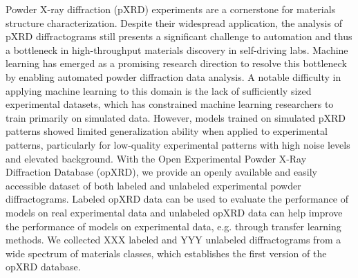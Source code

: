 Powder X-ray diffraction (pXRD) experiments are a cornerstone for materials structure characterization.
Despite their widespread application, the analysis of pXRD diffractograms still presents a significant challenge to automation and thus a bottleneck in high-throughput materials discovery in self-driving labs.
Machine learning has emerged as a promising research direction to resolve this bottleneck by enabling automated powder diffraction data analysis.
A notable difficulty in applying machine learning to this domain is the lack of sufficiently sized experimental datasets, which has constrained machine learning researchers to train primarily on simulated data. However, models trained on simulated pXRD patterns showed limited generalization ability when applied to experimental patterns, particularly for low-quality experimental patterns with high noise levels and elevated background.
With the Open Experimental Powder X-Ray Diffraction Database (opXRD), we provide an openly available and easily accessible dataset of both labeled and unlabeled experimental powder diffractograms.
Labeled opXRD data can be used to evaluate the performance of models on real experimental data and unlabeled opXRD data can help improve the performance of models on experimental data, e.g. through transfer learning methods.
We collected XXX labeled and YYY unlabeled diffractograms from a wide spectrum of materials classes, which establishes the first version of the opXRD database.
